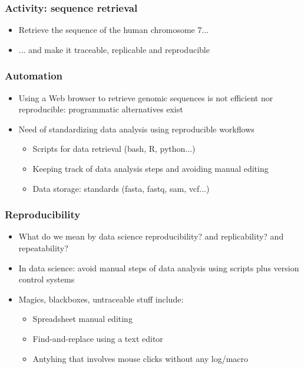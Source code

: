 \documentclass{beamer}
\begin{document}
\begin{frame}
  \frametitle{Activity: sequence retrieval}
  \begin{itemize}
  \item Retrieve the sequence of the human chromosome 7...
  \item ... and make it traceable, replicable and reproducible
  \end{itemize}
\end{frame}


\begin{frame}
  \frametitle{Automation}
  \begin{itemize}
  \item Using a Web browser to retrieve genomic sequences is not efficient nor reproducible: programmatic alternatives exist
  \item Need of standardizing data analysis using reproducible workflows
    \begin{itemize}

    \item Scripts for data retrieval (bash, R, python...)
    \item Keeping track of data analysis steps and avoiding manual editing
    \item Data storage: standards (fasta, fastq, sam, vcf...)
    \end{itemize}
  \end{itemize}
\end{frame}




\begin{frame}
  \frametitle{Reproducibility}
  \begin{itemize}
  \item What do we mean by data science reproducibility? and replicability? and repeatability?
  \item In data science: avoid manual steps of data analysis using scripts plus version control systems
  \item Magics, blackboxes, untraceable stuff include:
    \begin{itemize}
    \item Spreadsheet manual editing
    \item Find-and-replace using a text editor
    \item Antyhing that involves mouse clicks without any log/macro
    \end{itemize}
  \end{itemize}

\end{frame}
\end{document}

